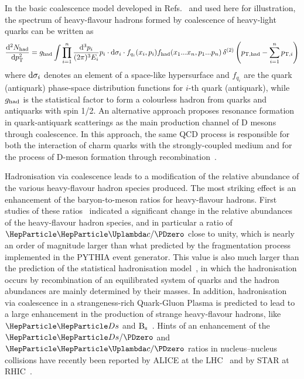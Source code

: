 In the basic coalescence model developed in Refs.~\cite{Greco:2003mm,Greco:2003vf,Fries:2003kq,Fries:2003vb,Oh:2009zj,Minissale:2015zwa,Plumari:2017ntm} and used here for illustration,
the spectrum of heavy-flavour hadrons formed by coalescence of heavy-light quarks can be written as
\begin{equation}
\label{eq-coal}
\frac{{\rm d}^{2}N_{\rm had}}{{\rm d}\pT^{2}}
= g_{\rm had} \int \prod^{n}_{i=1} \frac{{\rm d}^{3}p_{i}}{(2\pi)^{3}E_{i}} p_{i} 
\cdot {\rm d}\sigma_{i}  \cdot f_{q_i}(x_{i}, p_{i})  
f_{\rm had}(x_{1}...x_{n}, p_{1}...p_{n})\, 
\delta^{(2)} \left(p_{\rm T,had}-\sum^{n}_{i=1} p_{{\rm T},i}\right)
\end{equation}
where ${\rm d}\sigma_{i}$ denotes an element of a space-like hypersurface and $f_{q_i}$ are the quark (antiquark)
phase-space distribution functions for $i$-th quark (antiquark), while $g_{\rm had}$ is the statistical factor
to form a colourless hadron from quarks and antiquarks with spin 1/2. An alternative approach proposes resonance formation in quark-antiquark scatterings as the main production channel of D mesons through coalescence. In this approach, the same QCD process is responsible for both the interaction of charm quarks with the strongly-coupled medium and for the process of D-meson formation through recombination~\cite{RAVAGLI2007126,PhysRevC.86.014903}.

Hadronisation via coalescence leads to a modification of the relative abundance of the
various heavy-flavour hadron species produced. 
The most striking effect is an enhancement of the baryon-to-meson ratios for heavy-flavour hadrons.
First studies of these ratios~\cite{Oh:2009zj,Plumari:2017ntm} indicated a significant change in the relative abundances of the heavy-flavour hadron species, and in particular a ratio of $\PGLc/\PDzero$ close to unity, which
is nearly an order of magnitude larger than what predicted by the fragmentation
process implemented in the PYTHIA event generator. 
This value is also much larger than the
prediction of the statistical hadronisation model~\cite{Andronic:2007zu}, in which the hadronisation occurs by recombination of an equilibrated system of quarks and the hadron abundances are mainly determined by their masses.
In addition, hadronisation via coalescence in a strangeness-rich Quark-Gluon Plasma is predicted to lead to a large enhancement in the production of strange heavy-flavour hadrons, like $\PDs$ and $\rm B_s$~\cite{Kuznetsova:2006hx,He:2014cla,Song:2015ykw}.
Hints of an enhancement of the $\PDs/\PDzero$ and $\PGLc/\PDzero$ ratios in nucleus--nucleus collisions have recently been reported by ALICE at the LHC~\cite{Acharya:2018hre,Peng:2018pwj} and by STAR at RHIC~\cite{Radhakrishnan:2018xxx}.

